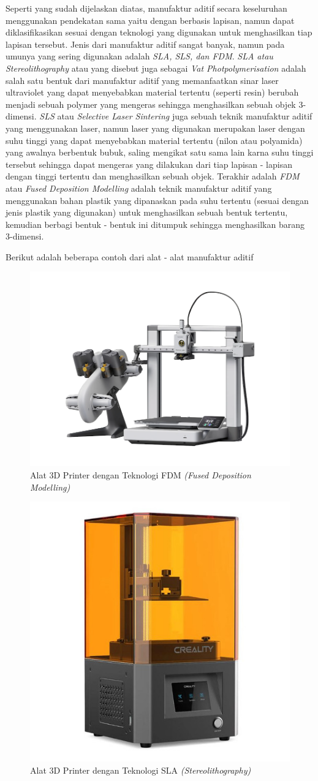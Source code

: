 Seperti yang sudah dijelaskan diatas, manufaktur aditif secara keseluruhan menggunakan pendekatan sama yaitu dengan berbasis lapisan, namun dapat diklasifikasikan sesuai dengan teknologi yang digunakan untuk menghasilkan tiap lapisan tersebut. Jenis dari manufaktur aditif sangat banyak, namun pada umunya yang sering digunakan adalah \textit{SLA, SLS, dan FDM}. \textit{SLA atau Stereolithography} atau yang disebut juga sebagai \textit{Vat Photpolymerisation} adalah salah satu bentuk dari manufaktur aditif yang memanfaatkan sinar laser ultraviolet yang dapat menyebabkan material tertentu (seperti resin) berubah menjadi sebuah polymer yang mengeras sehingga menghasilkan sebuah objek 3-dimensi. \textit{SLS} atau \textit{Selective Laser Sintering} juga sebuah teknik manufaktur aditif yang menggunakan laser, namun laser yang digunakan merupakan laser dengan suhu tinggi yang dapat menyebabkan material tertentu (nilon atau polyamida) yang awalnya berbentuk bubuk, saling mengikat satu sama lain karna suhu tinggi tersebut sehingga dapat mengeras yang dilakukan dari tiap lapisan - lapisan dengan tinggi tertentu dan menghasilkan sebuah objek. Terakhir adalah \textit{FDM} atau \textit{Fused Deposition Modelling} adalah teknik manufaktur aditif yang menggunakan bahan plastik yang dipanaskan pada suhu tertentu (sesuai dengan jenis plastik yang digunakan) untuk menghasilkan sebuah bentuk tertentu, kemudian berbagi bentuk - bentuk ini ditumpuk sehingga menghasilkan barang 3-dimensi.

Berikut adalah beberapa contoh dari alat - alat manufaktur aditif

\begin{figure}[H]
    \centering
    \includegraphics[width=0.35\linewidth]{gambar/fdm-3d-printer.png}
    \caption{Alat 3D Printer dengan Teknologi FDM \textit{(Fused Deposition Modelling)}}
    \label{fig:fdm-3d-printer}
\end{figure}

\begin{figure}[H]
    \centering
    \includegraphics[width=0.25\linewidth]{gambar/sla-3d-printer.jpg}
    \caption{Alat 3D Printer dengan Teknologi SLA \textit{(Stereolithography)}}
    \label{fig:sla-3d-printer}
\end{figure}

